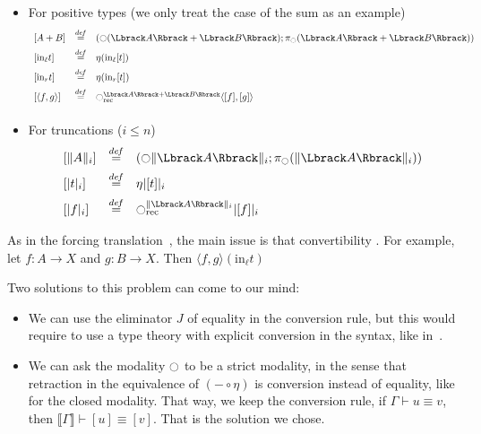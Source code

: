 \begin{itemize}
\item For positive types (we only treat the case of the sum as an example)
\[
\begin{array}{lcl}
\left[  A+B \right] &\defeq& \left( \modal(\Lbrack A \Rbrack + \Lbrack B
                        \Rbrack); \pi_\modal(\Lbrack A \Rbrack + \Lbrack B
                        \Rbrack)\right)\\[0.5em]
\left[  \mathrm{in}_\ell t \right] &\defeq& \eta (\mathrm{in}_\ell [t]) \\[0.5em]
\left[  \mathrm{in}_r t \right] &\defeq& \eta (\mathrm{in}_r [t]) \\[0.5em]
\left[ \langle f ,g\rangle\right] &\defeq& \modal_{\mathrm{rec}}^{\Lbrack A\Rbrack +
                                      \Lbrack B\Rbrack} \langle
                                      [f],[g]\rangle\\[0.5em]
\end{array}
\]
\item For truncations ($i\leqslant n$)
\[
\begin{array}{lcl}
  \left[  \|A\|_i \right] &\defeq& (\modal \| \Lbrack A\Rbrack  \|_i;
                                   \pi_\modal(\| \Lbrack A\Rbrack
                                   \|_i)) \\[0.5em]
  \left[ |t|_i \right] &\defeq& \eta |[t]|_i \\[0.5em]
  \left[ |f|_i \right] &\defeq& \modal_{\mathrm{rec}}^{\| \Lbrack
                                  A\Rbrack  \|_i} | [f] |_i
\end{array}
\]

\end{itemize}

As in the forcing translation~\cite{jaber2012extending}, the main
issue is that convertibility . For
example, let $f:A \to X$ and $g:B\to X$. Then $\langle f,g\rangle
(\mathrm{in}_\ell t)$


Two solutions to this problem can come to our mind:
\begin{itemize}
\item We can use the eliminator $J$ of equality in the conversion
  rule, but this would require to use a type theory with explicit
  conversion in the syntax, like in~\cite{jaber2012extending}.
\item We can ask the modality $\ocircle$ to be a strict modality, in the
  sense that retraction in the equivalence of $(-\circ\eta)$ is conversion
  instead of equality, like for the closed modality. 
  That way, we keep the conversion rule, \ie{} if $\Gamma \vdash
  u \equiv v$, then $\Lbrack \Gamma \Rbrack \vdash [u] \equiv [v]$.
  That is the solution we chose.
\end{itemize}

